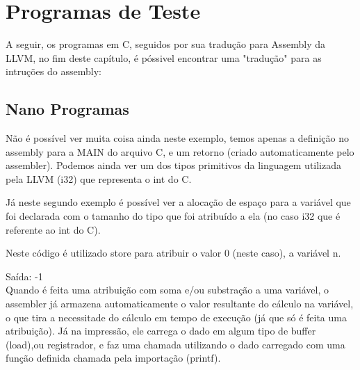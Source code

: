 \documentclass[12pt,a4paper,twoside]{report}
\begin{document}
\chapter{Programas de Teste}

A seguir, os programas em C, seguidos por sua tradução para Assembly da LLVM, no fim deste capítulo, é póssivel encontrar uma "tradução" para as intruções do assembly:

\section{Nano Programas}


Não é possível ver muita coisa ainda neste exemplo, temos apenas a definição no assembly para a MAIN do arquivo C, e um retorno (criado automaticamente pelo assembler). Podemos ainda ver um dos tipos primitivos da linguagem utilizada pela LLVM (i32) que representa o int do C.



Já neste segundo exemplo é possível ver a alocação de espaço para a variável que foi declarada com o tamanho do tipo que foi atribuído a ela (no caso i32 que é referente ao int do C).



Neste código é utilizado store para atribuir o valor 0 (neste caso), a variável n.



Saída: -1\\
Quando é feita uma atribuição com soma e/ou substração a uma variável, o assembler já armazena automaticamente o valor resultante do cálculo na variável, o que tira a necessitade do cálculo em tempo de execução (já que só é feita uma atribuição). Já na impressão, ele carrega o dado em algum tipo de buffer (load),ou registrador, e faz uma chamada utilizando o dado carregado com uma função definida chamada pela importação (printf).
\end{document}
